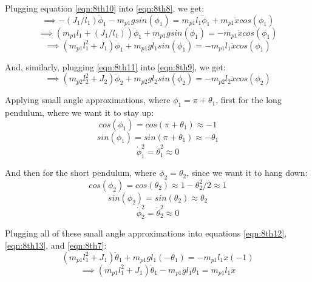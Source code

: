 \documentclass{article}
\begin{document}
Plugging equation \ref{eqn:8th10} into \ref{eqn:8th8}, we get:
\begin{equation*}
\implies - (J_1 / l_1) \ddot{\phi}_1 - m_{p1} g sin(\phi_1) = m_{p1} l_1 \ddot{\phi}_1 + m_{p1} \ddot{x} cos(\phi_1)
\end{equation*}
\begin{equation*}
\implies (m_{p1} l_1 + (J_1 / l_1)) \ddot{\phi}_1 + m_{p1} g sin(\phi_1) = -m_{p1} \ddot{x} cos(\phi_1)
\end{equation*}
\begin{equation}
\implies (m_{p1} l_1^2 + J_1) \ddot{\phi}_1 + m_{p1} g l_1 sin(\phi_1) = -m_{p1} l_1 \ddot{x} cos(\phi_1)
\label{eqn:8th12}
\end{equation}

And, similarly, plugging \ref{eqn:8th11} into \ref{eqn:8th9}, we get:
\begin{equation}
\implies (m_{p2} l_2^2 + J_2) \ddot{\phi}_2 + m_{p2} g l_2 sin(\phi_2) = -m_{p2} l_2 \ddot{x} cos(\phi_2)
\label{eqn:8th13}
\end{equation}

Applying small angle approximations, where $\phi_1 = \pi + \theta_1$, first for the long pendulum, where we want it to stay up:
\begin{equation*}
cos(\phi_1) = cos(\pi + \theta_1) \approx -1
\end{equation*}
\begin{equation*}
sin(\phi_1) = sin(\pi + \theta_1) \approx - \theta_1
\end{equation*}
\begin{equation*}
\dot{\phi}_1^2 = \dot{\theta}_1^2 \approx 0
\end{equation*}

And then for the short pendulum, where $\phi_2 = \theta_2$, since we want it to hang down:
\begin{equation*}
cos(\phi_2) = cos(\theta_2) \approx 1 - \theta_2^2 / 2 \approx 1
\end{equation*}
\begin{equation*}
sin(\phi_2) = sin(\theta_2) \approx \theta_2
\end{equation*}
\begin{equation*}
\dot{\phi}_2^2 = \dot{\theta}_2^2 \approx 0
\end{equation*}

Plugging all of these small angle approximations into equations \ref{eqn:8th12}, \ref{eqn:8th13}, and \ref{eqn:8th7}:
\begin{equation*}
(m_{p1} l_1^2 + J_1) \ddot{\theta}_1 + m_{p1} g l_1 (-\theta_1) = -m_{p1} l_1 \ddot{x} (-1)
\end{equation*}
\begin{equation}
\implies (m_{p1} l_1^2 + J_1) \ddot{\theta}_1 - m_{p1} g l_1 \theta_1 = m_{p1} l_1 \ddot{x}
\label{eqn:8th14}
\end{equation}
\end{document}
